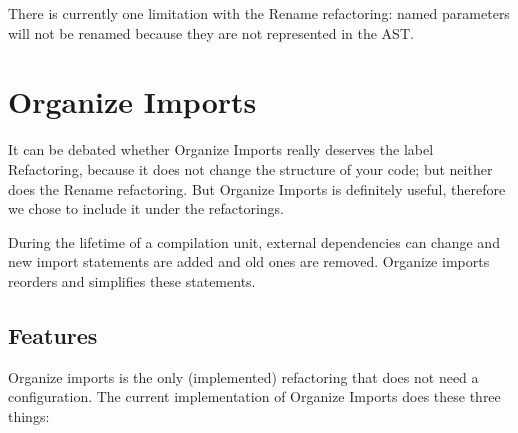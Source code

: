 \documentclass[10pt,a4paper,oneside]{scrreprt}
\begin{document}
There is currently one limitation with the Rename refactoring: named parameters will not be renamed because they are not represented in the AST.

\section{Organize Imports}

It can be debated whether Organize Imports really deserves the label Refactoring, because it does not change the structure of your code; but neither does the Rename refactoring. But Organize Imports is definitely useful, therefore we chose to include it under the refactorings.

During the lifetime of a compilation unit, external dependencies can change and new import statements are added and old ones are removed. Organize imports reorders and simplifies these statements.

\subsection{Features}

Organize imports is the only (implemented) refactoring that does not need a configuration. The current implementation of Organize Imports does these three things:
\end{document}
